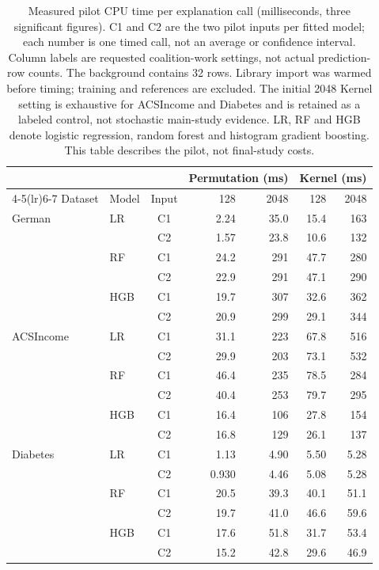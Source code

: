 \begin{table}[tb]
\centering
\caption{Measured pilot CPU time per explanation call (milliseconds, three significant figures). C1 and C2 are the two pilot inputs per fitted model; each number is one timed call, not an average or confidence interval. Column labels are requested coalition-work settings, not actual prediction-row counts. The background contains 32 rows. Library import was warmed before timing; training and references are excluded. The initial 2048 Kernel setting is exhaustive for ACSIncome and Diabetes and is retained as a labeled control, not stochastic main-study evidence. LR, RF and HGB denote logistic regression, random forest and histogram gradient boosting. This table describes the pilot, not final-study costs.}
\label{tab:pilot-call-costs}
\small
\begin{tabular}{llcrrrr}
\toprule
 & & & \multicolumn{2}{c}{Permutation (ms)} & \multicolumn{2}{c}{Kernel (ms)} \\
\cmidrule(lr){4-5}\cmidrule(lr){6-7}
Dataset & Model & Input & 128 & 2048 & 128 & 2048 \\
\midrule
German & LR & C1 & 2.24 & 35.0 & 15.4 & 163 \\
 &  & C2 & 1.57 & 23.8 & 10.6 & 132 \\
 & RF & C1 & 24.2 & 291 & 47.7 & 280 \\
 &  & C2 & 22.9 & 291 & 47.1 & 290 \\
 & HGB & C1 & 19.7 & 307 & 32.6 & 362 \\
 &  & C2 & 20.9 & 299 & 29.1 & 344 \\
\midrule
ACSIncome & LR & C1 & 31.1 & 223 & 67.8 & 516 \\
 &  & C2 & 29.9 & 203 & 73.1 & 532 \\
 & RF & C1 & 46.4 & 235 & 78.5 & 284 \\
 &  & C2 & 40.4 & 253 & 79.7 & 295 \\
 & HGB & C1 & 16.4 & 106 & 27.8 & 154 \\
 &  & C2 & 16.8 & 129 & 26.1 & 137 \\
\midrule
Diabetes & LR & C1 & 1.13 & 4.90 & 5.50 & 5.28 \\
 &  & C2 & 0.930 & 4.46 & 5.08 & 5.28 \\
 & RF & C1 & 20.5 & 39.3 & 40.1 & 51.1 \\
 &  & C2 & 19.7 & 41.0 & 46.6 & 59.6 \\
 & HGB & C1 & 17.6 & 51.8 & 31.7 & 53.4 \\
 &  & C2 & 15.2 & 42.8 & 29.6 & 46.9 \\
\bottomrule
\end{tabular}
\end{table}
